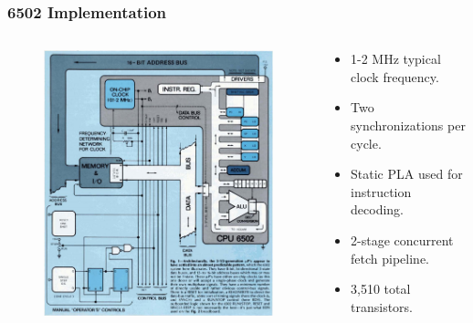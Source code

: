 \documentclass{beamer}
\begin{document}
\begin{frame}
\frametitle{6502 Implementation}
\begin{columns}[T]
\begin{column}[T]{0.5\textwidth}
\begin{figure}
\centering
\includegraphics[scale=0.3]{images/cpu_layout.png}
\end{figure}
\end{column}
\begin{column}[T]{0.5\textwidth}
\begin{itemize}
\item 1-2 MHz typical clock frequency.
\item Two synchronizations per cycle.
\item Static PLA used for instruction decoding.
\item 2-stage concurrent fetch pipeline.
\item 3,510 total transistors.
\end{itemize}
\end{column}
\end{columns}
\end{frame}
\end{document}
